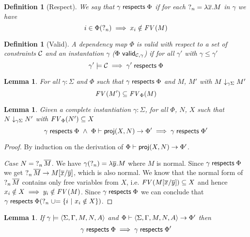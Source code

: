 \documentclass[11pt]{article}
\newtheorem{lemma}[theorem]{Lemma}
\newtheorem{definition}[theorem]{Definition}
\begin{document}
\begin{definition}[Respect]
    We say that $\gamma\respects\Phi$ if for each $\Meta n = \LAM{\overline
    x}M$ in $\gamma$ we have \[i\in\PhiSet n\implies x_i\notin\FV{}M \]
\end{definition}

\begin{definition}[Valid]
    A dependency map $\Phi$ is {\em valid} with respect to a set of constraints
    $\C$ and an instantation $\gamma$ ($\Valid\Phi\C\gamma$) if for all
    $\gamma'$ with $\gamma\leq\gamma'$
    \[\gamma'\Solves\C\implies\gamma'\respects\Phi\]
\end{definition}

\begin{lemma}\label{normaliseFreeLem}
    For all $\gamma:\Sigma$ and $\Phi$ such that $\gamma\respects\Phi$ and $M$,
    $M'$ with $\Normalise{\gamma\Sigma}M{M'}$
    \[\FV{}{M'}\subseteq\FV\Phi M\]
\end{lemma}

\begin{lemma}\label{projRespecLem}
    Given a complete instantiation $\gamma:\Sigma$, for all $\Phi$, $N$, $X$
    such that $\Normalise{\gamma\Sigma}N{N'}$ with $\FV\Phi{N'}\subseteq X$
    \[\gamma\respects\Phi~\wedge~\Indep\Phi{\proj XN}{\Phi'}\implies
    \gamma\respects\Phi'\]
\end{lemma}

\begin{proof}
    By induction on the derivation of $\Indep\Phi{\proj XN}{\Phi'}$.

    {\em Case $N=\Meta n\,\overline M$}. We have $\gamma(\Meta n) =
    \LAM{\overline y}M$ where $M$ is normal. Since $\gamma\respects\Phi$ we get
    $\Meta n\,\overline M\rightarrow \Subst M{\overline y}{\overline x}$, which
    is also normal. We know that the normal form of $\Meta n\,\overline M$
    contains only free variables from $X$, i.e. $\FV{}{\Subst M{\overline
    y}{\overline x}}\subseteq X$ and hence $x_i\notin X\implies
    y_i\notin\FV{}M$. Since $\gamma\respects\Phi$ we can conclude that
    $\gamma\respects\UIndep\Phi ni{x_i\notin X}$.
\end{proof}

\begin{lemma}\label{validLem}
    If $\gamma\Solves\Constr\Sigma\Gamma MNA$ and
    $\Indep\Phi{\Constr\Sigma\Gamma MNA}{\Phi'}$ then
    \[\gamma\respects\Phi \implies \gamma\respects\Phi'\]
\end{lemma}
\end{document}
